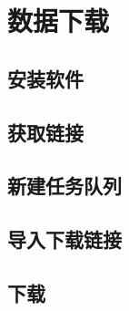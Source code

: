 \section{数据下载}
\subsection{安装软件}
\subsection{获取链接}
\subsection{新建任务队列}
\subsection{导入下载链接}
\subsection{下载}